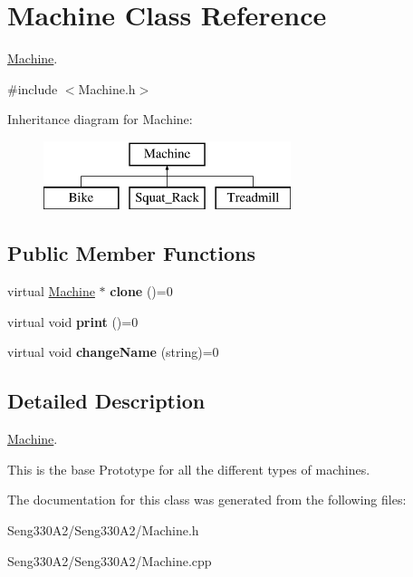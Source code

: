 \hypertarget{class_machine}{}\section{Machine Class Reference}
\label{class_machine}


\hyperlink{class_machine}{Machine}.  




{\ttfamily \#include $<$Machine.\+h$>$}

Inheritance diagram for Machine\+:\begin{figure}[H]
\begin{center}
\leavevmode
\includegraphics[height=2.000000cm]{class_machine}
\end{center}
\end{figure}
\subsection*{Public Member Functions}
\begin{DoxyCompactItemize}
\item 
\hypertarget{class_machine_a2175bf6ebeb5b3d83c35534de8e5dc3d}{}virtual \hyperlink{class_machine}{Machine} $\ast$ {\bfseries clone} ()=0\label{class_machine_a2175bf6ebeb5b3d83c35534de8e5dc3d}

\item 
\hypertarget{class_machine_a0fab59a376dd6cd5708a0d95fab48d0c}{}virtual void {\bfseries print} ()=0\label{class_machine_a0fab59a376dd6cd5708a0d95fab48d0c}

\item 
\hypertarget{class_machine_a3cc1f418d54f49ac547b08f5cbb01846}{}virtual void {\bfseries change\+Name} (string)=0\label{class_machine_a3cc1f418d54f49ac547b08f5cbb01846}

\end{DoxyCompactItemize}


\subsection{Detailed Description}
\hyperlink{class_machine}{Machine}. 

This is the base Prototype for all the different types of machines. 

The documentation for this class was generated from the following files\+:\begin{DoxyCompactItemize}
\item 
Seng330\+A2/\+Seng330\+A2/Machine.\+h\item 
Seng330\+A2/\+Seng330\+A2/Machine.\+cpp\end{DoxyCompactItemize}
